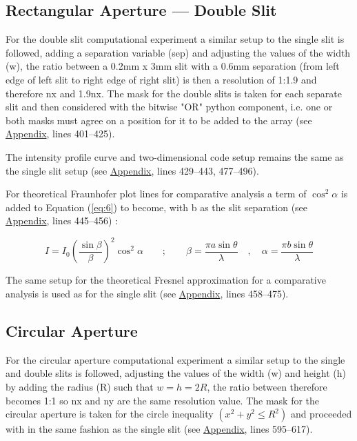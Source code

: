 \documentclass[12pt]{article}
\begin{document}
\subsection{Rectangular Aperture — Double Slit}

For the double slit computational experiment a similar setup to the single slit is followed, adding a separation variable (sep) and adjusting the values of the width (w), the ratio between a
0.2mm x 3mm slit with a 0.6mm separation (from left edge of left slit to right edge of right slit) is then a resolution of 1:1.9 and therefore nx and 1.9nx. The mask for the double slits is taken for each separate slit 
and then considered with the bitwise "OR" python component, i.e. one or both masks must agree on a position for it to be added to the array (see \hyperref[sec:A]{Appendix}, lines 401–425).

The intensity profile curve and two-dimensional code setup remains the same as the single slit setup (see \hyperref[sec:A]{Appendix}, lines 429–443, 477–496).

For theoretical Fraunhofer plot lines for comparative analysis a term of \( \cos^2 \alpha \) is added to Equation (\ref{eq:6}) to become, with b as the slit separation (see \hyperref[sec:A]{Appendix}, lines 445–456) \cite{bootcamp}:

\begin{equation} \label{eq:8}
    I = I_0 \left( \frac{\sin \beta}{\beta} \right) ^2 \cos^2 \alpha \qquad ; \qquad \beta = \frac{\pi a \sin \theta}{\lambda} \quad , \quad \alpha = \frac{\pi b \sin \theta}{\lambda}
\end{equation}

The same setup for the theoretical Fresnel approximation for a comparative analysis is used as for the single slit (see \hyperref[sec:A]{Appendix}, lines 458–475).

\subsection{Circular Aperture}

For the circular aperture computational experiment a similar setup to the single and double slits is followed, adjusting the values of the width (w) and height (h) by adding the radius (R) such that \( w=h=2R \), the ratio between therefore
becomes 1:1 so nx and ny are the same resolution value. The mask for the circular aperture is taken for the circle inequality \( (x^2 + y^2 \leq R^2) \) and proceeded with in the same fashion
as the single slit (see \hyperref[sec:A]{Appendix}, lines 595–617).
\end{document}
